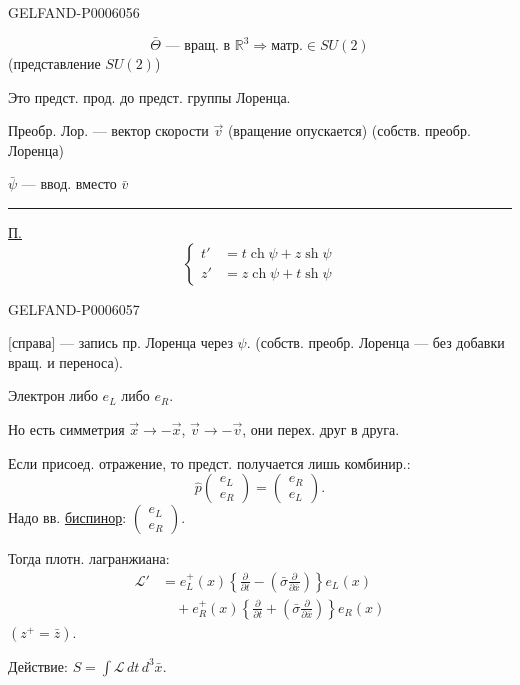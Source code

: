 \begin{GelfandAdjacentEvidence}{GELFAND-P000605}{6}

\[
\bar\Theta\text{ — вращ. в }\mathbb R^3\Longrightarrow\text{матр.}\in SU(2)
\]
(представление \(SU(2)\))

Это предст. прод. до предст. группы Лоренца.

Преобр. Лор. — вектор скорости \(\vec v\) (вращение опускается)
(собств. преобр. Лоренца)

 \(\bar\psi\) — ввод. вместо \(\bar v\)

\rule{.28\linewidth}{.4pt}\par
\underline{\underline{П.}}
\[
\left\{\begin{aligned}
t'&=t\operatorname{ch}\psi+z\operatorname{sh}\psi\\
z'&=z\operatorname{ch}\psi+t\operatorname{sh}\psi
\end{aligned}\right.
\]
\end{GelfandAdjacentEvidence}
\begin{GelfandAdjacentEvidence}{GELFAND-P000605}{7}

[справа] — запись пр. Лоренца через \(\psi\).
(собств. преобр. Лоренца — без добавки вращ. и переноса).

Электрон либо \(e_L\) либо \(e_R\).

Но есть симметрия \(\vec x\longrightarrow-\vec x\), \(\vec v\longrightarrow-\vec v\), они перех. друг в друга.

Если присоед. отражение, то предст. получается лишь комбинир.:
\[
\hat p\begin{pmatrix}e_L\\e_R\end{pmatrix}
=\begin{pmatrix}e_R\\e_L\end{pmatrix}.
\]
Надо вв. \underline{биспинор}: \(\begin{pmatrix}e_L\\e_R\end{pmatrix}\).

Тогда плотн. лагранжиана:
\[
\begin{aligned}
\mathcal L'&=e_L^+(x)\left\{\frac{\partial}{\partial t}
-\left(\bar\sigma\frac{\partial}{\partial\bar x}\right)\right\}e_L(x)\\
&\quad+e_R^+(x)\left\{\frac{\partial}{\partial t}
+\left(\bar\sigma\frac{\partial}{\partial\bar x}\right)\right\}e_R(x)
\end{aligned}
\]
\((z^+=\bar z)\).

Действие: \(S=\int\mathcal L\,dt\,d^3\bar x\).
\end{GelfandAdjacentEvidence}


